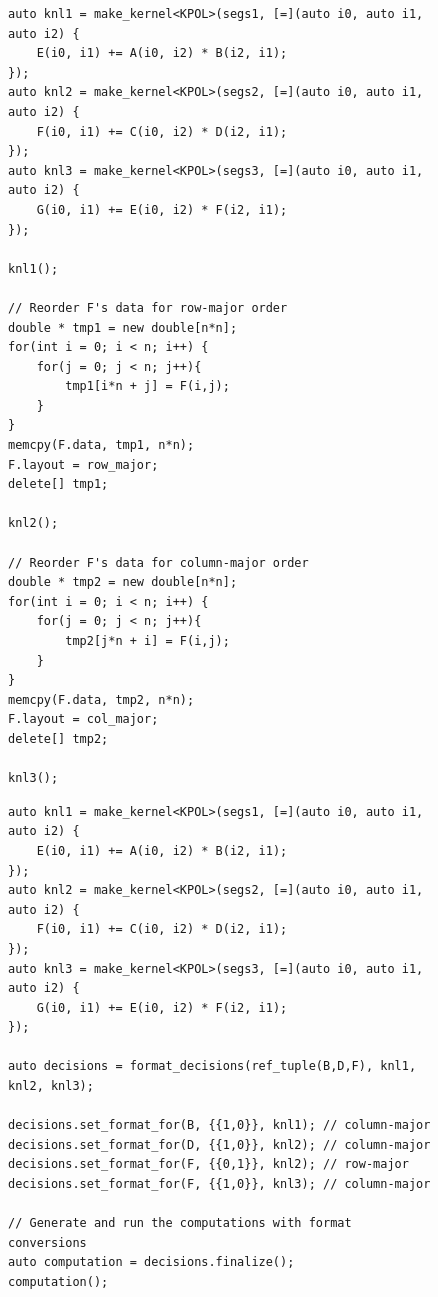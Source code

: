 \documentclass[sigconf,review=true]{acmart}
\newcommand{\FormatDecisions}[0]{{\textsc{FormatDecisions}}}
\begin{document}
\begin{figure}
	\begin{lstlisting}[caption={Changing data layouts for one View in the \textsc{3mm} benchmark manually.},label={ByHand3MM}]
auto knl1 = make_kernel<KPOL>(segs1, [=](auto i0, auto i1, auto i2) {
	E(i0, i1) += A(i0, i2) * B(i2, i1);
});
auto knl2 = make_kernel<KPOL>(segs2, [=](auto i0, auto i1, auto i2) {
	F(i0, i1) += C(i0, i2) * D(i2, i1);
});
auto knl3 = make_kernel<KPOL>(segs3, [=](auto i0, auto i1, auto i2) {
	G(i0, i1) += E(i0, i2) * F(i2, i1);
});

knl1();

// Reorder F's data for row-major order
double * tmp1 = new double[n*n];
for(int i = 0; i < n; i++) {
	for(j = 0; j < n; j++){
		tmp1[i*n + j] = F(i,j);
	}
}
memcpy(F.data, tmp1, n*n);
F.layout = row_major;
delete[] tmp1;

knl2();

// Reorder F's data for column-major order
double * tmp2 = new double[n*n];
for(int i = 0; i < n; i++) {
	for(j = 0; j < n; j++){
		tmp2[j*n + i] = F(i,j);
	}
}
memcpy(F.data, tmp2, n*n);
F.layout = col_major;
delete[] tmp2;

knl3();
	\end{lstlisting}
\end{figure}

\begin{figure}
\begin{lstlisting}[caption={Changing data layouts for three Views in the \textsc{3mm} benchmark using \FormatDecisions.},
	label={FormatDecisions3MM}]
auto knl1 = make_kernel<KPOL>(segs1, [=](auto i0, auto i1, auto i2) {
	E(i0, i1) += A(i0, i2) * B(i2, i1);
});
auto knl2 = make_kernel<KPOL>(segs2, [=](auto i0, auto i1, auto i2) {
	F(i0, i1) += C(i0, i2) * D(i2, i1);
});
auto knl3 = make_kernel<KPOL>(segs3, [=](auto i0, auto i1, auto i2) {
	G(i0, i1) += E(i0, i2) * F(i2, i1);
});

auto decisions = format_decisions(ref_tuple(B,D,F), knl1, knl2, knl3);

decisions.set_format_for(B, {{1,0}}, knl1); // column-major
decisions.set_format_for(D, {{1,0}}, knl2); // column-major
decisions.set_format_for(F, {{0,1}}, knl2); // row-major
decisions.set_format_for(F, {{1,0}}, knl3); // column-major

// Generate and run the computations with format conversions
auto computation = decisions.finalize();
computation();
\end{lstlisting}
\end{figure}
\end{document}
